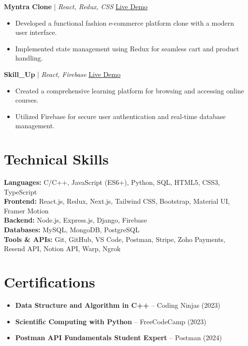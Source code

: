 \documentclass[a4paper,10pt]{article}
\begin{document}
\textbf{Myntra Clone} | \textit{React, Redux, CSS} \hfill \href{https://abhishek6827.github.io/Myntra/}{Live Demo}
\begin{itemize}[leftmargin=0.15in, label={-}]
    \item Developed a functional fashion e-commerce platform clone with a modern user interface.
    \item Implemented state management using Redux for seamless cart and product handling.
\end{itemize}

\textbf{Skill\_Up} | \textit{React, Firebase} \hfill \href{https://abhishek6827.github.io/Skill_Up/}{Live Demo}
\begin{itemize}[leftmargin=0.15in, label={-}]
    \item Created a comprehensive learning platform for browsing and accessing online courses.
    \item Utilized Firebase for secure user authentication and real-time database management.
\end{itemize}

\section{Technical Skills}
\textbf{Languages:} C/C++, JavaScript (ES6+), Python, SQL, HTML5, CSS3, TypeScript \\
\textbf{Frontend:} React.js, Redux, Next.js, Tailwind CSS, Bootstrap, Material UI, Framer Motion \\
\textbf{Backend:} Node.js, Express.js, Django, Firebase \\
\textbf{Databases:} MySQL, MongoDB, PostgreSQL \\
\textbf{Tools \& APIs:} Git, GitHub, VS Code, Postman, Stripe, Zoho Payments, Resend API, Notion API, Warp, Ngrok

\section{Certifications}
\begin{itemize}[leftmargin=0.15in, label={-}]
    \item \textbf{Data Structure and Algorithm in C++} -- Coding Ninjas (2023)
    \item \textbf{Scientific Computing with Python} -- FreeCodeCamp (2023)
    \item \textbf{Postman API Fundamentals Student Expert} -- Postman (2024)
\end{itemize}
\end{document}
